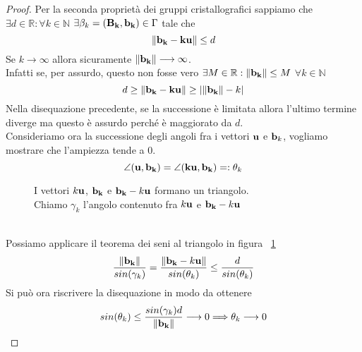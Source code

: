\documentclass[12pt,a4paper]{book}
\begin{document}
\begin{proof}
Per la seconda proprietà dei gruppi cristallografici sappiamo che \\
$ \exists d \in \mathbb{R} : \forall k \in \mathbb{N} $ $  \exists \beta_k = \vb{( B_k, b_k)} \in \Gamma  $ tale che 
\[  \norm{\vb{b_k - ku }} \leq d \]
Se $k \longrightarrow \infty$ allora sicuramente $ \norm{\vb{b_k}} \longrightarrow \infty$.  \\
Infatti se, per assurdo, questo non fosse vero $\exists M \in \mathbb{R} : \norm{\vb{b_k}} \leq M $   $  \forall k \in \mathbb{N} $
\[ d \geq \norm{\vb{b_k - ku}} \geq | \norm{\vb{b_k}} - k | \]
Nella disequazione  precedente, se la successione è limitata allora l'ultimo termine diverge ma questo è assurdo perché è maggiorato da $d$. \\
Consideriamo ora la successione degli angoli fra i vettori $\vb{u}$ e $\vb{b}_k$, vogliamo mostrare che l'ampiezza tende a 0. 
\[ \angle (\vb{u , b_k}) = \angle (\vb{ku, b_k}) = : \theta_k \]
\begin{figure}[!h]
\centering
\label{fig:trangolo1}
\centering
\caption{I vettori $k \vb{u}$, $\vb{b_k}$ e $\vb{b_k}-k\vb{u}$ formano un triangolo. \\ Chiamo $\gamma_k$ l'angolo contenuto fra $k \vb{u}$ e $\vb{b_k}-k\vb{u}$}
\end{figure} \\
Possiamo applicare il teorema dei seni al triangolo in figura ~\ref{fig:trangolo1}
\[ \frac{\norm{\vb{b_k}}}{sin(\gamma_k)} = \frac{\norm{\vb{b_k} - k\vb{u}}}{sin(\theta_k)}  \leq \frac{d}{sin(\theta_k)} \]
Si può ora riscrivere la disequazione in modo da ottenere
\[  sin(\theta_k) \leq \frac{sin(\gamma_k)d}{\norm{\vb{b_k}}} \longrightarrow 0 \Longrightarrow \theta_k \longrightarrow 0 \]


\end{proof}
\end{document}
